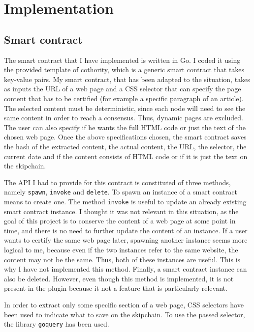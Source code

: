 \section{Implementation}

\subsection{Smart contract}

The smart contract that I have implemented is written in Go. I coded it using the provided template of cothority, which is a generic smart contract that takes key-value pairs. My smart contract, that has been adapted to the situation, takes as inputs the URL of a web page and a CSS selector that can specify the page content that has to be certified (for example a specific paragraph of an article). The selected content must be deterministic, since each node will need to see the same content in order to reach a consensus. Thus, dynamic pages are excluded. The user can also specify if he wants the full HTML code or just the text of the chosen web page. Once the above specifications chosen, the smart contract saves the hash of the extracted content, the actual content, the URL, the selector, the current date and if the content consists of HTML code or if it is just the text on the skipchain.

The API I had to provide for this contract is constituted of three methods, namely \texttt{spawn}, \texttt{invoke} and \texttt{delete}. To spawn an instance of a smart contract means to create one. The method \texttt{invoke} is useful to update an already existing smart contract instance. I thought it was not relevant in this situation, as the goal of this project is to conserve the content of a web page at some point in time, and there is no need to further update the content of an instance. If a user wants to certify the same web page later, spawning another instance seems more logical to me, because even if the two instances refer to the same website, the content may not be the same. Thus, both of these instances are useful. This is why I have not implemented this method. Finally, a smart contract instance can also be deleted. However, even though this method is implemented, it is not present in the plugin because it not a feature that is particularly relevant. 

In order to extract only some specific section of a web page, CSS selectors have been used to indicate what to save on the skipchain. To use the passed selector, the library \texttt{goquery}\cite{goquery} has been used.

